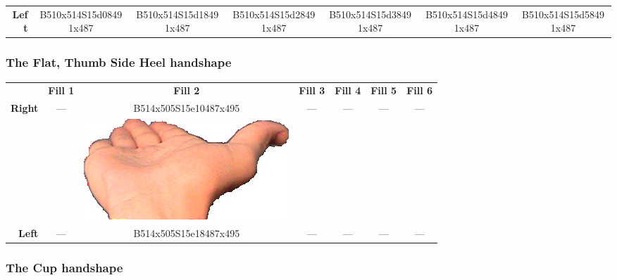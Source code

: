 \documentclass{article}
\begin{document}
\begin{center}
\begin{tabular}{r*{6}{c}}
\textbf{Left}&
B510x514S15d08491x487&
B510x514S15d18491x487&
B510x514S15d28491x487&
B510x514S15d38491x487&
B510x514S15d48491x487&
B510x514S15d58491x487\\
\end{tabular}
\end{center}

\subsubsection{The Flat, Thumb Side Heel handshape}

\begin{center}
\begin{tabular}{r*{6}{c}}
&\textbf{Fill 1}&\textbf{Fill 2}&\textbf{Fill 3}&\textbf{Fill 4}&\textbf{Fill 5}&\textbf{Fill 6}\\
\multirow{2}{*}{\textbf{Right}}&
\multirow{2}{*}{---}&
B514x505S15e10487x495&
\multirow{2}{*}{---}&
\multirow{2}{*}{---}&
\multirow{2}{*}{---}&
\multirow{2}{*}{---}\\
&
&
\includegraphics[scale=0.1]{images/05-13-2.jpg}\\
\textbf{Left}&
---&
B514x505S15e18487x495&
---&
---&
---&
---\\
\end{tabular}
\end{center}

\subsubsection{The Cup handshape}
\end{document}
